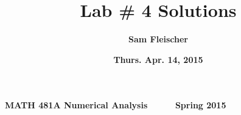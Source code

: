\documentclass[12pt]{article}
\begin{document}
{\bf MATH 481A \hfill Numerical Analysis \ \ \ \ \ \hfill Spring 2015}

\title{\bf Lab \# 4 Solutions}
\author{\bf Sam Fleischer}
\date{\bf Thurs. Apr. 14, 2015}

{\let\newpage\relax\maketitle}
\maketitle
\tableofcontents
\pagebreak
\end{document}
